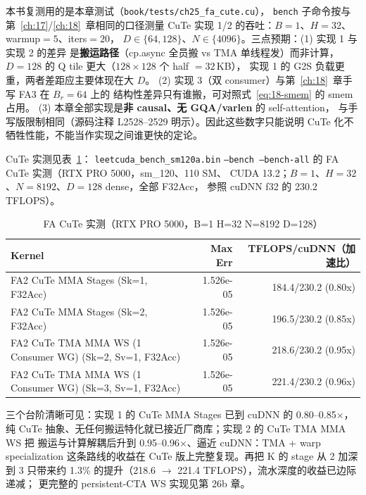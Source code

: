 本书复测用的是本章测试（\texttt{book/\allowbreak{}tests/\allowbreak{}ch25\_\allowbreak{}fa\_\allowbreak{}cute.\allowbreak{}cu}），
\texttt{bench} 子命令按与第~\ref{ch:17}/\ref{ch:18}~章相同的口径测量
CuTe 实现 1/2 的吞吐：$B{=}1$、$H{=}32$、warmup$=5$、iters$=20$，
$D\in\{64,128\}$、$N\in\{4096\}$。三点预期：(1) 实现 1 与实现 2 的差异
是\textbf{搬运路径}（cp.async 全员搬 vs TMA 单线程发）而非计算，
$D{=}128$ 的 Q tile 更大（$128\times128$ 个 half $=32$\,KB），
实现 1 的 G2S 负载更重，两者差距应主要体现在大 $D$。
(2) 实现 3（双 consumer）与第~\ref{ch:18}~章手写 FA3 在 $B_r{=}64$ 上的
结构性差异只有谁搬，可对照式~\ref{eq:18-smem} 的 smem 占用。
(3) 本章全部实现是\textbf{非 causal、无 GQA/varlen} 的 self-attention，
与手写版限制相同（源码注释 L2528--2529 明示）。因此这些数字只能说明
CuTe 化不牺牲性能，不能当作实现之间谁更快的定论。

CuTe 实测见表~\ref{tab:ch25-perf}：
\texttt{leetcuda\_\allowbreak{}bench\_\allowbreak{}sm120a.\allowbreak{}bin}
\texttt{--bench --bench-all} 的 FA CuTe 实测（RTX PRO 5000，sm\_120、110 SM、
CUDA 13.2；$B{=}1$、$H{=}32$、$N{=}8192$、$D{=}128$ dense，全部 F32Acc，
参照 cuDNN f32 的 230.2 TFLOPS）。

\begin{table}[H]
\centering
\caption{FA CuTe 实测（RTX PRO 5000，B=1 H=32 N=8192 D=128）}
\label{tab:ch25-perf}
\footnotesize
\setlength{\tabcolsep}{4pt}
\begin{tabular}{lrr}
\toprule
Kernel & Max Err & TFLOPS/cuDNN（加速比） \\
\midrule
FA2 CuTe MMA Stages (Sk=1, F32Acc) & 1.526e-05 & 184.4/230.2 (0.80x) \\
FA2 CuTe MMA Stages (Sk=2, F32Acc) & 1.526e-05 & 196.5/230.2 (0.85x) \\
FA2 CuTe TMA MMA WS (1 Consumer WG) (Sk=2, Sv=1, F32Acc) & 1.526e-05 & 218.6/230.2 (0.95x) \\
FA2 CuTe TMA MMA WS (1 Consumer WG) (Sk=3, Sv=1, F32Acc) & 1.526e-05 & 221.4/230.2 (0.96x) \\
\bottomrule
\end{tabular}
\end{table}

三个台阶清晰可见：实现 1 的 CuTe MMA Stages 已到 cuDNN 的 0.80--0.85$\times$，
纯 CuTe 抽象、无任何搬运特化就已接近厂商库；实现 2 的 CuTe TMA MMA WS 把
搬运与计算解耦后升到 0.95--0.96$\times$、逼近 cuDNN：TMA + warp
specialization 这条路线的收益在 CuTe 版上完整复现。再把 K 的 stage 从 2 加深到
3 只带来约 1.3\% 的提升（218.6 $\to$ 221.4 TFLOPS），流水深度的收益已边际递减；
更完整的 persistent-CTA WS 实现见第 26b 章。

